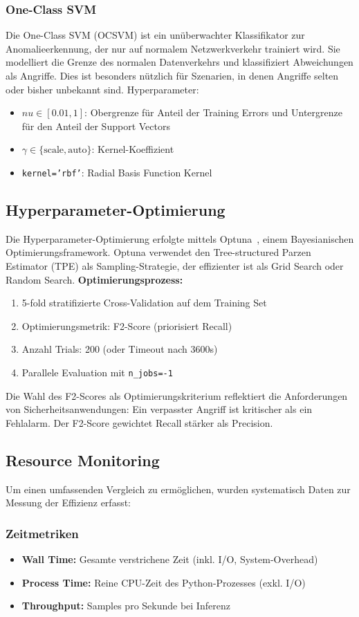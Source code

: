 \documentclass[12pt,oneside]{article}
\begin{document}
	\subsubsection{One-Class SVM}
	Die One-Class SVM (OCSVM) ist ein unüberwachter Klassifikator zur Anomalieerkennung, der nur auf normalem Netzwerkverkehr trainiert wird. Sie modelliert die Grenze des normalen Datenverkehrs und klassifiziert Abweichungen als Angriffe. Dies ist besonders nützlich für Szenarien, in denen Angriffe selten oder bisher unbekannt sind. \newpage
	Hyperparameter:
	\begin{itemize}
		\item $nu \in [0.01, 1]$: Obergrenze für Anteil der Training Errors und Untergrenze für den Anteil der Support Vectors
		\item $\gamma \in \{\text{scale}, \text{auto}\}$: Kernel-Koeffizient
		\item \texttt{kernel='rbf'}: Radial Basis Function Kernel
	\end{itemize}
	
	\subsection{Hyperparameter-Optimierung}
	Die Hyperparameter-Optimierung erfolgte mittels Optuna~\cite{optuna2019}, einem Bayesianischen Optimierungsframework. Optuna verwendet den Tree-structured Parzen Estimator (TPE) als Sampling-Strategie, der effizienter ist als Grid Search oder Random Search.
	\textbf{Optimierungsprozess:}
	\begin{enumerate}
		\item 5-fold stratifizierte Cross-Validation auf dem Training Set
		\item Optimierungsmetrik: F2-Score (priorisiert Recall)
		\item Anzahl Trials: 200 (oder Timeout nach 3600s)
		\item Parallele Evaluation mit \texttt{n\_jobs=-1}
	\end{enumerate}
	Die Wahl des F2-Scores als Optimierungskriterium reflektiert die Anforderungen von Sicherheitsanwendungen: Ein verpasster Angriff ist kritischer als ein Fehlalarm. Der F2-Score gewichtet Recall stärker als Precision.
	\subsection{Resource Monitoring}
	Um einen umfassenden Vergleich zu ermöglichen, wurden systematisch Daten zur Messung der Effizienz erfasst:
	\subsubsection{Zeitmetriken}
	\begin{itemize}
		\item \textbf{Wall Time:} Gesamte verstrichene Zeit (inkl. I/O, System-Overhead)
		\item \textbf{Process Time:} Reine CPU-Zeit des Python-Prozesses (exkl. I/O)
		\item \textbf{Throughput:} Samples pro Sekunde bei Inferenz
	\end{itemize}
\end{document}

